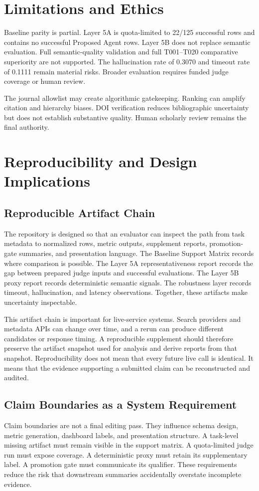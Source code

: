 \documentclass[10pt,twocolumn]{article}
\begin{document}
\section{Limitations and Ethics}
Baseline parity is partial. Layer 5A is quota-limited to 22/125 successful rows and contains no successful Proposed Agent rows. Layer 5B does not replace semantic evaluation. Full semantic-quality validation and full T001--T020 comparative superiority are not supported. The hallucination rate of 0.3070 and timeout rate of 0.1111 remain material risks. Broader evaluation requires funded judge coverage or human review.

The journal allowlist may create algorithmic gatekeeping. Ranking can amplify citation and hierarchy biases. DOI verification reduces bibliographic uncertainty but does not establish substantive quality. Human scholarly review remains the final authority.

\section{Reproducibility and Design Implications}
\subsection{Reproducible Artifact Chain}
The repository is designed so that an evaluator can inspect the path from task metadata to normalized rows, metric outputs, supplement reports, promotion-gate summaries, and presentation language. The Baseline Support Matrix records where comparison is possible. The Layer 5A representativeness report records the gap between prepared judge inputs and successful evaluations. The Layer 5B proxy report records deterministic semantic signals. The robustness layer records timeout, hallucination, and latency observations. Together, these artifacts make uncertainty inspectable.

This artifact chain is important for live-service systems. Search providers and metadata APIs can change over time, and a rerun can produce different candidates or response timing. A reproducible supplement should therefore preserve the artifact snapshot used for analysis and derive reports from that snapshot. Reproducibility does not mean that every future live call is identical. It means that the evidence supporting a submitted claim can be reconstructed and audited.

\subsection{Claim Boundaries as a System Requirement}
Claim boundaries are not a final editing pass. They influence schema design, metric generation, dashboard labels, and presentation structure. A task-level missing artifact must remain visible in the support matrix. A quota-limited judge run must expose coverage. A deterministic proxy must retain its supplementary label. A promotion gate must communicate its qualifier. These requirements reduce the risk that downstream summaries accidentally overstate incomplete evidence.
\end{document}
